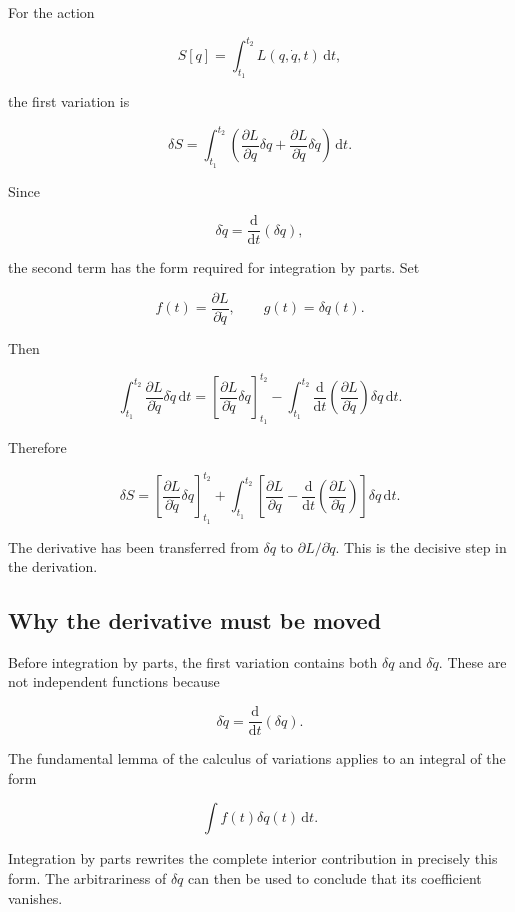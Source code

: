 For the action

\[
S[q]
=
\int_{t_{1}}^{t_{2}}
L(q,\dot q,t)
\,\mathrm{d}t,
\]

the first variation is

\[
\delta S
=
\int_{t_{1}}^{t_{2}}
\left(
\frac{\partial L}{\partial q}\delta q
+
\frac{\partial L}{\partial\dot q}\delta\dot q
\right)
\,\mathrm{d}t.
\]

Since

\[
\delta\dot q
=
\frac{\mathrm{d}}{\mathrm{d}t}(\delta q),
\]

the second term has the form required for integration by parts. Set

\[
f(t)
=
\frac{\partial L}{\partial\dot q},
\qquad
g(t)=\delta q(t).
\]

Then

\[
\int_{t_{1}}^{t_{2}}
\frac{\partial L}{\partial\dot q}
\delta\dot q
\,\mathrm{d}t
=
\left[
\frac{\partial L}{\partial\dot q}
\delta q
\right]_{t_{1}}^{t_{2}}
-
\int_{t_{1}}^{t_{2}}
\frac{\mathrm{d}}{\mathrm{d}t}
\left(
\frac{\partial L}{\partial\dot q}
\right)
\delta q
\,\mathrm{d}t.
\]

Therefore

\[
\boxed{
\delta S
=
\left[
\frac{\partial L}{\partial\dot q}
\delta q
\right]_{t_{1}}^{t_{2}}
+
\int_{t_{1}}^{t_{2}}
\left[
\frac{\partial L}{\partial q}
-
\frac{\mathrm{d}}{\mathrm{d}t}
\left(
\frac{\partial L}{\partial\dot q}
\right)
\right]
\delta q
\,\mathrm{d}t
}.
\]

The derivative has been transferred from \(\delta q\) to \(\partial L/\partial\dot q\). This is the decisive step in the derivation.

\subsection{Why the derivative must be moved}

Before integration by parts, the first variation contains both \(\delta q\) and \(\delta\dot q\). These are not independent functions because

\[
\delta\dot q
=
\frac{\mathrm{d}}{\mathrm{d}t}(\delta q).
\]

The fundamental lemma of the calculus of variations applies to an integral of the form

\[
\int f(t)\delta q(t)\,\mathrm{d}t.
\]

Integration by parts rewrites the complete interior contribution in precisely this form. The arbitrariness of \(\delta q\) can then be used to conclude that its coefficient vanishes.

